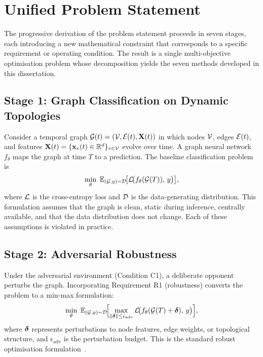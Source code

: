 \section{Unified Problem Statement}
\label{sec:problem_statement}
\label{sec:unified_problem}

The progressive derivation of the problem statement proceeds in seven stages, each introducing a new mathematical constraint that corresponds to a specific requirement or operating condition. The result is a single multi-objective optimisation problem whose decomposition yields the seven methods developed in this dissertation.

\subsection{Stage 1: Graph Classification on Dynamic Topologies}

Consider a temporal graph $\mathcal{G}(t)=(\mathcal{V},\mathcal{E}(t),\mathbf{X}(t))$ in which nodes $\mathcal{V}$, edges $\mathcal{E}(t)$, and features $\mathbf{X}(t)=\{\mathbf{x}_v(t)\in\mathbb{R}^{d}\}_{v\in\mathcal{V}}$ evolve over time. A graph neural network $f_\theta$ maps the graph at time $T$ to a prediction. The baseline classification problem is
\begin{equation}
\min_\theta\;
\mathbb{E}_{(\mathcal{G},y)\sim\mathcal{D}}\!\bigl[
  \mathcal{L}\!\bigl(f_\theta(\mathcal{G}(T)),\,y\bigr)
\bigr],
\label{eq:ps_base}
\end{equation}
where $\mathcal{L}$ is the cross-entropy loss and $\mathcal{D}$ is the data-generating distribution. This formulation assumes that the graph is clean, static during inference, centrally available, and that the data distribution does not change. Each of these assumptions is violated in practice.

\subsection{Stage 2: Adversarial Robustness}

Under the adversarial environment (Condition C1), a deliberate opponent perturbs the graph. Incorporating Requirement R1 (robustness) converts the problem to a min-max formulation:\begin{equation}
\min_\theta\;
\mathbb{E}_{(\mathcal{G},y)\sim\mathcal{D}}\!\Bigl[
  \max_{\|\boldsymbol{\delta}\|\le\epsilon_{\mathrm{adv}}}
    \mathcal{L}\!\bigl(f_\theta(\mathcal{G}(T)+\boldsymbol{\delta}),\,y\bigr)
\Bigr],
\label{eq:ps_robust}
\end{equation}
where $\boldsymbol{\delta}$ represents perturbations to node features, edge weights, or topological structure, and $\epsilon_{\mathrm{adv}}$ is the perturbation budget. This is the standard robust optimisation formulation~\cite{Madry2018,Goodfellow2015,Szegedy2014}.

